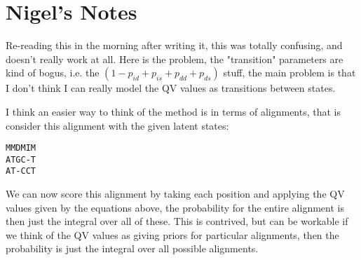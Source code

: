\documentclass[fleqn,10pt]{SelfArx} %
\begin{document}
\section{Nigel's Notes}

Re-reading this in the morning after writing it, this was totally confusing, and doesn't really work at all.  Here is the problem, the "transition" parameters are kind of bogus, i.e. the   $ (1-p_{id}+p_{is}+p_{dd}+p_{ds}) $ stuff, the main problem is that I don't think I can really model the QV values as transitions between states. 

I think an easier way to think of the method is in terms of alignments, that is consider this alignment with the given latent states: 

 \begin{center}
 \texttt{MMDMIM}\\
\texttt{ATGC-T}\\
\texttt{AT-CCT}
\end{center}

We can now score this alignment by taking each position and applying the QV values given by the equations above, the probability for the entire alignment is then just the integral over all of these.  This is contrived, but can be workable if we think of the QV values as giving priors for particular alignments, then the probability is just the integral over all possible alignments.

\end{document}
